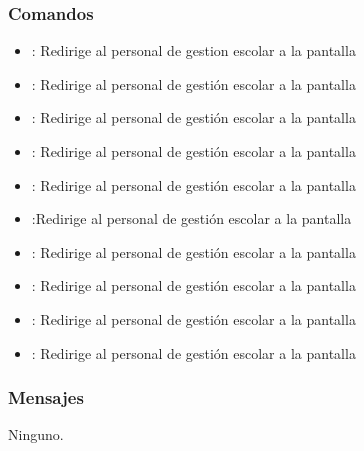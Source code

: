 \subsubsection{Comandos}
\begin{itemize}
	\item {}: Redirige al personal de gestion escolar a la pantalla 
	
	\item {}: Redirige al personal de gestión escolar a la pantalla 
	\item {}: Redirige al personal de gestión escolar a la pantalla 
	
	\item {}: Redirige al personal de gestión escolar a la pantalla 
	\item {}: Redirige al personal de gestión escolar a la pantalla 
	
	\item {}:Redirige al personal de gestión escolar a la pantalla
	
	\item {}: Redirige al personal de gestión escolar a la pantalla 
	\item {}: Redirige al personal de gestión escolar a la pantalla 
	
	\item {}: Redirige al personal de gestión escolar a la pantalla 
	\item {}: Redirige al personal de gestión escolar a la pantalla 
	
\end{itemize}

\subsubsection{Mensajes}

\begin{Citemize}
	\item Ninguno.
\end{Citemize}

